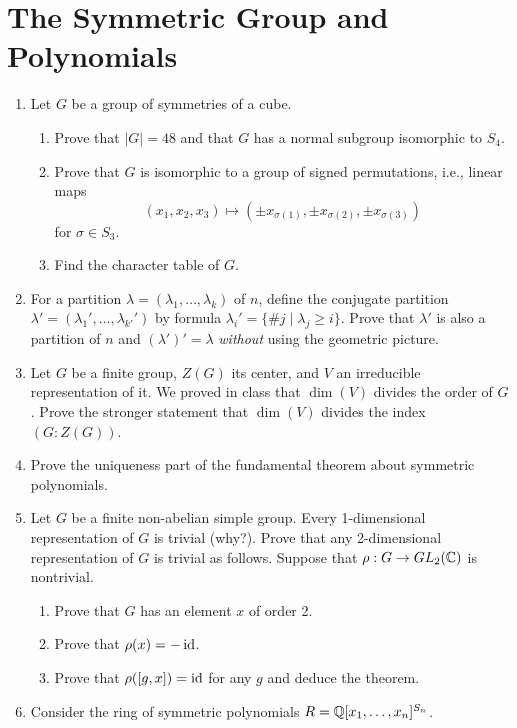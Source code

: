 \documentclass[../psets.tex]{subfiles}
\begin{document}
\section{The Symmetric Group and Polynomials}
\begin{enumerate}
    \item {}Let $G$ be a group of symmetries of a cube.
    \begin{enumerate}
        \item Prove that $|G|=48$ and that $G$ has a normal subgroup isomorphic to $S_4$.
        \item Prove that $G$ is isomorphic to a group of signed permutations, i.e., linear maps
        \begin{equation*}
            (x_1,x_2,x_3) \mapsto (\pm x_{\sigma(1)},\pm x_{\sigma(2)},\pm x_{\sigma(3)})
        \end{equation*}
        for $\sigma\in S_3$.
        \item Find the character table of $G$.
    \end{enumerate}
    \item For a partition $\lambda=(\lambda_1,\dots,\lambda_k)$ of $n$, define the conjugate partition $\lambda'=(\lambda_1',\dots,\lambda_{k'}')$ by formula $\lambda_i'=\{\#j\mid\lambda_j\geq i\}$. Prove that $\lambda'$ is also a partition of $n$ and $(\lambda')'=\lambda$ \emph{without} using the geometric picture.
    \item Let $G$ be a finite group, $Z(G)$ its center, and $V$ an irreducible representation of it. We proved in class that $\dim(V)$ divides the order of $G$. Prove the stronger statement that $\dim(V)$ divides the index $(G:Z(G))$.
    \item Prove the uniqueness part of the fundamental theorem about symmetric polynomials.
    \item Let $G$ be a finite non-abelian simple group. Every 1-dimensional representation of $G$ is trivial (why?).
    Prove that any 2-dimensional representation of $G$ is trivial as follows. Suppose that $\rho:G\to GL_2(\mathbb{C})$ is nontrivial.
    \begin{enumerate}
        \item Prove that $G$ has an element $x$ of order 2.
        \item Prove that $\rho(x)=-\operatorname{id}$.
        \item Prove that $\rho([g,x])=\operatorname{id}$ for any $g$ and deduce the theorem.
    \end{enumerate}
    \item Consider the ring of symmetric polynomials $R=\mathbb{Q}[x_1,\dots,x_n]^{S_n}$.

\end{enumerate}
\end{document}

